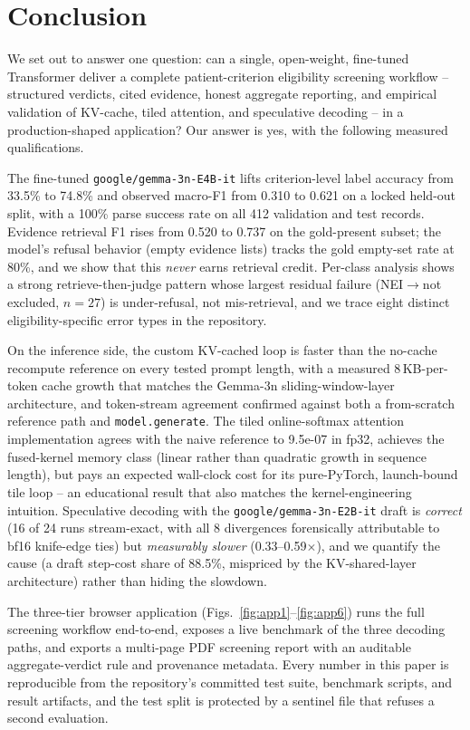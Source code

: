 \documentclass[conference]{IEEEtran}
\newcommand{\code}[1]{\texttt{\small #1}}
\newcommand{\modelname}{\texttt{google/gemma-3n-E4B-it}}
\newcommand{\draftname}{\texttt{google/gemma-3n-E2B-it}}
\begin{document}
\section{Conclusion}
\label{sec:conclusion}

We set out to answer one question: can a single, open-weight,
fine-tuned Transformer deliver a complete patient-criterion
eligibility screening workflow -- structured verdicts, cited
evidence, honest aggregate reporting, and empirical validation of
KV-cache, tiled attention, and speculative decoding -- in a
production-shaped application? Our answer is yes, with the
following measured qualifications.

The fine-tuned \modelname{} lifts criterion-level
label accuracy from 33.5\% to 74.8\% and observed macro-F1 from
0.310 to 0.621 on a locked held-out split, with a 100\% parse
success rate on all 412 validation and test records. Evidence retrieval F1 rises from
0.520 to 0.737 on the gold-present subset; the model's
refusal behavior (empty evidence lists) tracks the gold
empty-set rate at 80\%, and we show that this
\emph{never} earns retrieval credit. Per-class analysis shows a
strong retrieve-then-judge pattern whose largest residual
failure (NEI$\to$not excluded, $n=27$) is under-refusal, not
mis-retrieval, and we trace eight distinct eligibility-specific
error types in the repository.

On the inference side, the custom KV-cached loop is faster than
the no-cache recompute reference on every tested prompt length,
with a measured 8\,KB-per-token cache growth that matches the
Gemma-3n sliding-window-layer architecture, and token-stream
agreement confirmed against both a from-scratch reference path
and \code{model.generate}. The tiled online-softmax attention
implementation agrees with the naive reference to 9.5e-07 in
fp32, achieves the fused-kernel memory class (linear rather than
quadratic growth in sequence length), but pays an
expected wall-clock cost for its pure-PyTorch, launch-bound
tile loop -- an educational result that also matches the
kernel-engineering intuition. Speculative decoding with the
\draftname{} draft is \emph{correct} (16 of 24 runs stream-exact,
with all 8 divergences forensically attributable to bf16
knife-edge ties) but \emph{measurably slower} (0.33--0.59$\times$),
and we quantify the cause (a draft step-cost share of 88.5\%,
mispriced by the KV-shared-layer architecture) rather
than hiding the slowdown.

The three-tier browser application
(Figs.~\ref{fig:app1}--\ref{fig:app6}) runs the full
screening workflow end-to-end, exposes a live benchmark of the
three decoding paths, and exports a multi-page PDF screening
report with an auditable aggregate-verdict rule and provenance
metadata. Every number in this paper is reproducible from the
repository's committed test suite, benchmark scripts, and
result artifacts, and the test split is protected by a
sentinel file that refuses a second evaluation.
\end{document}
